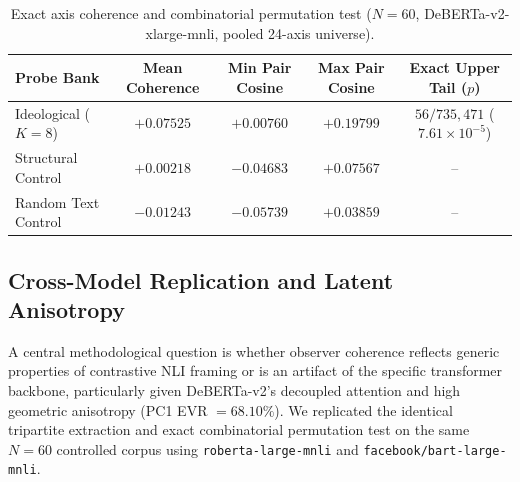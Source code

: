 \begin{table}[htbp]
\centering
\small
\begin{tabular}{lcccc}
\toprule
\textbf{Probe Bank} & \textbf{Mean Coherence} & \textbf{Min Pair Cosine} & \textbf{Max Pair Cosine} & \textbf{Exact Upper Tail ($p$)} \\
\midrule
Ideological ($K=8$)   & $+0.07525$ & $+0.00760$ & $+0.19799$ & $56 / 735{,}471$ ($7.61 \times 10^{-5}$) \\
Structural Control    & $+0.00218$ & $-0.04683$ & $+0.07567$ & -- \\
Random Text Control   & $-0.01243$ & $-0.05739$ & $+0.03859$ & -- \\
\bottomrule
\end{tabular}
\caption{Exact axis coherence and combinatorial permutation test ($N=60$, DeBERTa-v2-xlarge-mnli, pooled 24-axis universe).}
\label{tab:axis_coherence_baseline}
\end{table}

\subsection{Cross-Model Replication and Latent Anisotropy}
\label{sec:cross_model_results}

A central methodological question is whether observer coherence reflects generic properties of contrastive NLI framing or is an artifact of the specific transformer backbone, particularly given DeBERTa-v2's decoupled attention and high geometric anisotropy (PC1 EVR $= 68.10\%$). We replicated the identical tripartite extraction and exact combinatorial permutation test on the same $N=60$ controlled corpus using \texttt{roberta-large-mnli} and \texttt{facebook/bart-large-mnli}.

\begin{table}[htbp]
\centering
\small
{}
\caption{Cross-model replication of axis coherence across transformer architectures on identical $N=60$ corpus.}
\label{tab:cross_model_replication}
\end{table}

